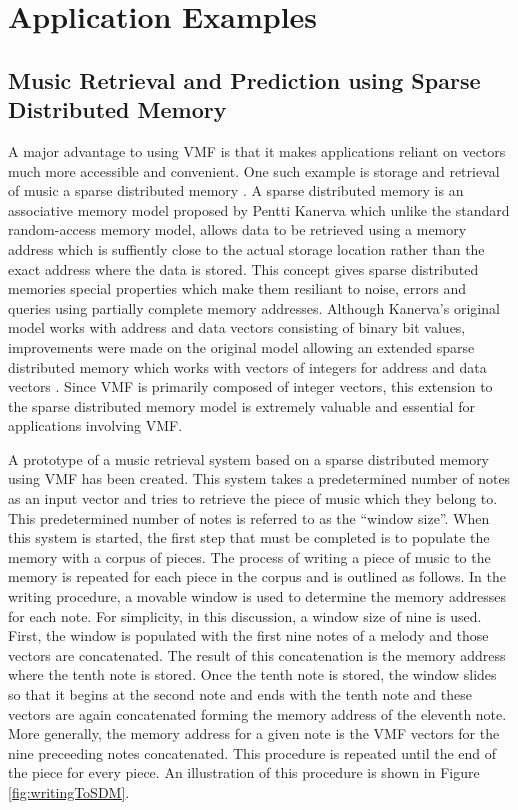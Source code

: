 
\section{Application Examples}

\subsection{Music Retrieval and Prediction using Sparse Distributed Memory}

A major advantage to using VMF is that it makes applications reliant on vectors much more accessible and convenient. One such example is storage and retrieval of music a sparse distributed memory \citep*{Kane88, Roge89}. A sparse distributed memory is an associative memory model proposed by Pentti Kanerva which unlike the standard random-access memory model, allows data to be retrieved using a memory address which is suffiently close to the actual storage location rather than the exact address where the data is stored. This concept gives sparse distributed memories special properties which make them resiliant to noise, errors and queries using partially complete memory addresses. Although Kanerva's original model works with address and data vectors consisting of binary bit values, improvements were made on the original model allowing an extended sparse distributed memory which works with vectors of integers for address and data vectors \citep*{Snai13}. Since VMF is primarily composed of integer vectors, this extension to the sparse distributed memory model is extremely valuable and essential for applications involving VMF.

A prototype of a music retrieval system based on a sparse distributed memory using VMF has been created. This system takes a predetermined number of notes as an input vector and tries to retrieve the piece of music which they belong to. This predetermined number of notes is referred to as the ``window size''. When this system is started, the first step that must be completed is to populate the memory with a corpus of pieces. The process of writing a piece of music to the memory is repeated for each piece in the corpus and is outlined as follows. In the writing procedure, a movable window is used to determine the memory addresses for each note. For simplicity, in this discussion, a window size of nine is used. First, the window is populated with the first nine notes of a melody and those vectors are concatenated. The result of this concatenation is the memory address where the tenth note is stored. Once the tenth note is stored, the window slides so that it begins at the second note and ends with the tenth note and these vectors are again concatenated forming the memory address of the eleventh note. More generally, the memory address for a given note is the VMF vectors for the nine preceeding notes concatenated. This procedure is repeated until the end of the piece for every piece. An illustration of this procedure is shown in Figure \ref{fig:writingToSDM}.

